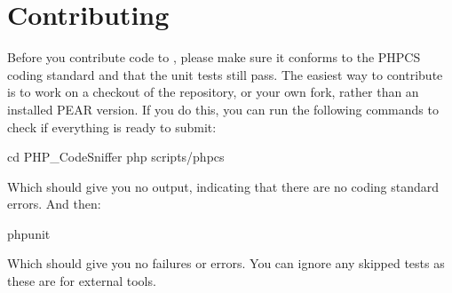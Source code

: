 \chapter{Contributing}
\hypertarget{md__c_1_2_users_2gallo_2_one_drive_2_documents_2_s_a_x_c3_x_a9-casali_2www_2wp-content_2plugins_1192fbe41a4dd66d45ef635e70fae919}{}\label{md__c_1_2_users_2gallo_2_one_drive_2_documents_2_s_a_x_c3_x_a9-casali_2www_2wp-content_2plugins_1192fbe41a4dd66d45ef635e70fae919}
Before you contribute code to , please make sure it conforms to the PHPCS coding standard and that the  unit tests still pass. The easiest way to contribute is to work on a checkout of the repository, or your own fork, rather than an installed PEAR version. If you do this, you can run the following commands to check if everything is ready to submit\+: \begin{DoxyVerb}cd PHP_CodeSniffer
php scripts/phpcs
\end{DoxyVerb}


Which should give you no output, indicating that there are no coding standard errors. And then\+: \begin{DoxyVerb}phpunit
\end{DoxyVerb}


Which should give you no failures or errors. You can ignore any skipped tests as these are for external tools. 